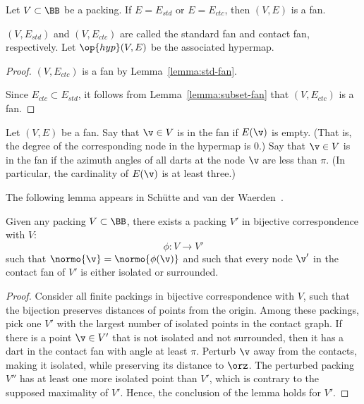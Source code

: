 \begin{lemma}[]
Let $V\subset \BB$ be a packing.  If $E=E_{std}$ or $E=E_{ctc}$, then
$(V,E)$ is a fan.
\end{lemma}
$(V,E_{std})$ and $(V,E_{ctc})$ are called the standard fan and
contact fan, respectively.  Let $\op{hyp}(V,E)$ be the associated
hypermap.  %
%
%
%
%
%
%

\begin{proof} 
$(V,E_{ctc})$ is a fan by Lemma~\ref{lemma:std-fan}.

Since $E_{ctc}\subset E_{std}$, it follows from
Lemma~\ref{lemma:subset-fan} that $(V,E_{ctc})$ is a fan.
\end{proof}

\begin{definition}
  Let $(V,E)$ be a fan.  Say that $\v\in V$ is  in
  the fan if $E(\v)$ is empty.  (That is, the degree of the
  corresponding node in the hypermap is $0$.) Say that $\v\in V$ is
   in the fan if the azimuth angles of all darts
  at the node $\v$ are less than $\pi$.  (In particular, the
  cardinality of $E(\v)$ is at least three.)
\end{definition}
%
%
%
%
%
%

The following lemma appears in Sch\"utte and van der
Waerden~\cite{vanderWaerden:1951}.

\begin{lemma}[]
Given any packing $V\subset \BB$,
there exists a  packing $V'$ 
in bijective correspondence with $V$:
\begin{displaymath}
\phi:V\to V'
\end{displaymath}
such that $\normo{\v} = \normo{\phi(\v)}$ and
such that every node $\v'$ in the contact fan of $V'$
is either isolated or surrounded.
\end{lemma}
%
%
%

\begin{proof} Consider all finite packings in bijective correspondence
  with $V$, such that the bijection preserves distances of points from
  the origin.  Among these packings, pick one $V'$ with the largest
  number of isolated points in the contact graph.  If there is a point
  $\v\in V'$ that is not isolated and not surrounded, then it has a
  dart in the contact fan with angle at least $\pi$.  Perturb $\v$ away from the
  contacts, making it isolated, while preserving its distance to
  $\orz$.  The perturbed packing $V''$ has at least one more isolated point
  than $V'$, which is contrary to the supposed maximality of $V'$.
  Hence, the conclusion of the lemma holds for $V'$.
\end{proof}

